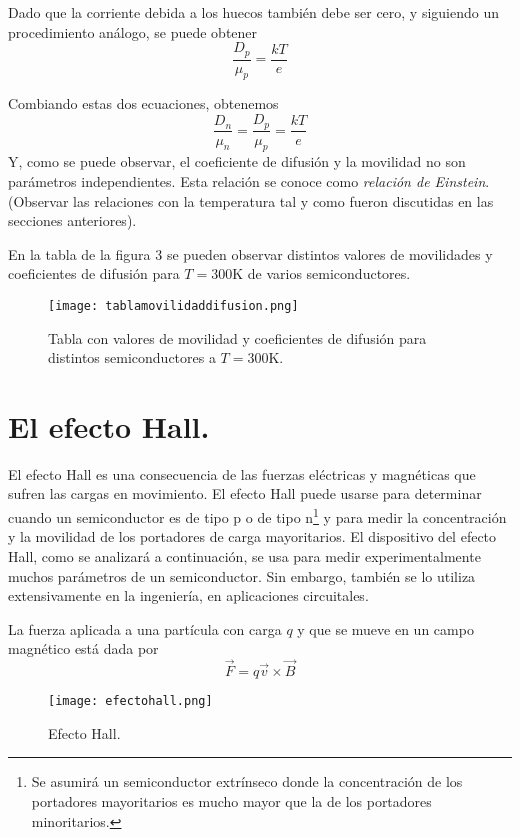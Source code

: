 \documentclass[12pt,a4paper]{article}
\begin{document}
Dado que la corriente debida a los huecos también debe ser cero, y siguiendo un procedimiento análogo, se puede obtener
\[ \frac{D_{p}}{\mu _{p}} = \frac{kT}{e} \]

Combiando estas dos ecuaciones, obtenemos
\[ \frac{D_{n}}{\mu _{n}} = \frac{D_{p}}{\mu _{p}} = \frac{kT}{e} \]
Y, como se puede observar, el coeficiente de difusión y la movilidad no son parámetros independientes. Esta relación se conoce como \emph{relación de Einstein}. (Observar las relaciones con la temperatura tal y como fueron discutidas en las secciones anteriores).

En la tabla de la figura 3 se pueden observar distintos valores de movilidades y coeficientes de difusión para $T=300$K de varios semiconductores.

\begin{figure}[ht!]
\begin{center}
\texttt{[image: tablamovilidaddifusion.png]}
\caption{Tabla con valores de movilidad y coeficientes de difusión para distintos semiconductores a $T=300$K.}
\end{center}
\end{figure}

\section{El efecto Hall.}

El efecto Hall es una consecuencia de las fuerzas eléctricas y magnéticas que sufren las cargas en movimiento. El efecto Hall puede usarse para determinar cuando un semiconductor es de tipo p o de tipo n\footnote{Se asumirá un semiconductor extrínseco donde la concentración de los portadores mayoritarios es mucho mayor que la de los portadores minoritarios.} y para medir la concentración y la movilidad de los portadores de carga mayoritarios. El dispositivo del efecto Hall, como se analizará a continuación, se usa para medir experimentalmente muchos parámetros de un semiconductor. Sin embargo, también se lo utiliza extensivamente en la ingeniería, en aplicaciones circuitales.

La fuerza aplicada a una partícula con carga $q$ y que se mueve en un campo magnético está dada por
\[ \vec{F} = q \vec{v} \times \vec{B} \]

\begin{figure}[ht!]
\begin{center}
\texttt{[image: efectohall.png]}
\caption{Efecto Hall.}
\end{center}
\end{figure}
\end{document}
